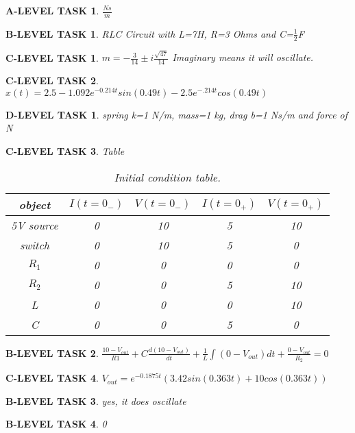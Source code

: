 \documentclass{book}
\numberwithin{equation}{section}
\newtheorem{alevel}{A-LEVEL TASK}
\newtheorem{blevel}{B-LEVEL TASK}
\newtheorem{clevel}{C-LEVEL TASK}
\newtheorem{dlevel}{D-LEVEL TASK}
\theoremstyle{definition}
\begin{document}
\begin{alevel}$\frac{Ns}{m}$\end{alevel}
\begin{blevel}RLC Circuit with L=7H, R=3 Ohms and C=$\frac{1}{2}$F\end{blevel}
\begin{clevel}$m=-\frac{3}{14} \pm i\frac{\sqrt{47}}{14}$ Imaginary means it will oscillate.\end{clevel}
\begin{clevel}$x(t)=2.5-1.092e^{-0.214t}sin(0.49 t)-2.5e^{-.214t}cos(0.49 t)$\end{clevel}
\begin{dlevel}spring k=1 N/m, mass=1 kg, drag b=1 Ns/m and force of N\end{dlevel}

\begin{clevel} Table\par
\begin{table}[H]
\begin{center}
\begin{tabular}{|c|c|c|c|c|} \hline
object	&$I(t=0_{-})$	&$V(t=0_{-})$	&$I(t=0_{+})$	&$V(t=0_{+})$ \\ \hline
5V source&0&10&5&10 \\ \hline
switch&0&10&5&0 \\ \hline
$R_1$&0&0&0&0 \\ \hline
$R_2$&0&0&5&10 \\ \hline
L&0&0&0&10 \\ \hline
C&0&0&5&0 \\ \hline
\end{tabular}
\caption{Initial condition table.}
\label{T:ic2}
\end{center}
\end{table}
\end{clevel}

\begin{blevel}$\frac{10-V_{out}}{R1}+C\frac{d(10-V_{out})}{dt}+\frac{1}{L}\int{(0-V_{out})dt}+\frac{0-V_{out}}{R_2}=0$\end{blevel}
\begin{clevel}$V_{out}=e^{-0.1875t}(3.42sin(0.363 t)+10cos(0.363 t))$\end{clevel}
\begin{blevel}yes, it does oscillate\end{blevel}
\begin{blevel}0\end{blevel}

\setcounter{alevel}{0} \setcounter{blevel}{0} \setcounter{clevel}{0} \setcounter{dlevel}{0}
\end{document}
